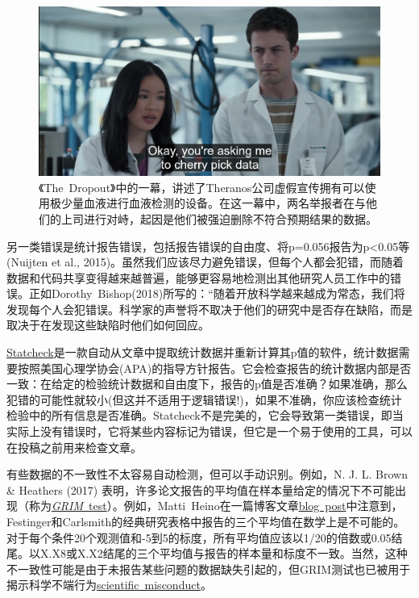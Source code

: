\documentclass[
  letterpaper,
  DIV=11,
  numbers=noendperiod]{scrreprt}
\begin{document}
\begin{figure}

{\centering \includegraphics[width=1\textwidth,height=\textheight]{images/dropout_outlier.png}

}

\caption{\label{fig-outliers}《The~Dropout》中的一幕，讲述了Theranos公司虚假宣传拥有可以使用极少量血液进行血液检测的设备。在这一幕中，两名举报者在与他们的上司进行对峙，起因是他们被强迫删除不符合预期结果的数据。}

\end{figure}

另一类错误是统计报告错误，包括报告错误的自由度、将p=0.056报告为p\textless0.05等(Nuijten
et al.,
2015)。虽然我们应该尽力避免错误，但每个人都会犯错，而随着数据和代码共享变得越来越普遍，能够更容易地检测出其他研究人员工作中的错误。正如Dorothy~Bishop(2018)所写的：``随着开放科学越来越成为常态，我们将发现每个人会犯错误。科学家的声誉将不取决于他们的研究中是否存在缺陷，而是取决于在发现这些缺陷时他们如何回应。

\href{http://statcheck.io/}{Statcheck}是一款自动从文章中提取统计数据并重新计算其p值的软件，统计数据需要按照美国心理学协会(APA)的指导方针报告。它会检查报告的统计数据内部是否一致：在给定的检验统计数据和自由度下，报告的p值是否准确？如果准确，那么犯错的可能性就较小(但这并不适用于逻辑错误!)，如果不准确，你应该检查统计检验中的所有信息是否准确。Statcheck不是完美的，它会导致第一类错误，即当实际上没有错误时，它将某些内容标记为错误，但它是一个易于使用的工具，可以在投稿之前用来检查文章。

有些数据的不一致性不太容易自动检测，但可以手动识别。例如，N. J. L. Brown
\& Heathers (2017)
表明，许多论文报告的平均值在样本量给定的情况下不可能出现（称为\href{http://nickbrown.fr/GRIM}{\emph{GRIM}}\href{http://nickbrown.fr/GRIM}{~test}）。例如，Matti~Heino在一篇博客文章\href{https://mattiheino.com/2016/11/13/legacy-of-psychology/}{blog~post}中注意到，Festinger和Carlsmith的经典研究表格中报告的三个平均值在数学上是不可能的。对于每个条件20个观测值和-5到5的标度，所有平均值应该以1/20的倍数或0.05结尾。以X.X8或X.X2结尾的三个平均值与报告的样本量和标度不一致。当然，这种不一致性可能是由于未报告某些问题的数据缺失引起的，但GRIM测试也已被用于揭示科学不端行为\href{https://en.wikipedia.org/wiki/GRIM_test}{scientific~misconduct}。
\end{document}
